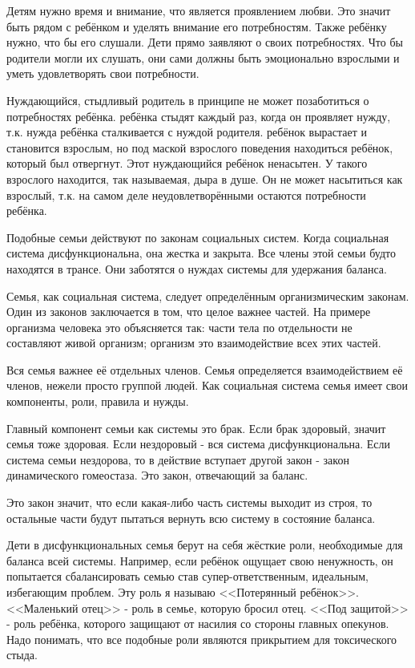 \documentclass[10pt, fleqn]{article}
\begin{document}
Детям нужно время и внимание, что является проявлением любви. Это значит быть рядом с ребёнком и уделять внимание его потребностям. Также ребёнку нужно, что бы его слушали. Дети прямо заявляют о своих потребностях. Что бы родители могли их слушать, они сами должны быть эмоционально взрослыми и уметь удовлетворять свои потребности.

Нуждающийся, стыдливый родитель в принципе не может позаботиться о потребностях ребёнка. ребёнка стыдят каждый раз, когда он проявляет нужду, т.к. нужда ребёнка сталкивается с нуждой родителя. ребёнок вырастает и становится взрослым, но под маской взрослого поведения находиться ребёнок, который был отвергнут. Этот нуждающийся ребёнок ненасытен. У такого взрослого находится, так называемая, дыра в душе. Он не может насытиться как взрослый, т.к. на самом деле неудовлетворёнными остаются потребности ребёнка.

Подобные семьи действуют по законам социальных систем. Когда социальная система дисфункциональна, она жестка и закрыта. Все члены этой семьи будто находятся в трансе. Они заботятся о нуждах системы для удержания баланса.



Семья, как социальная система, следует определённым организмическим законам. Один из законов заключается в том, что целое важнее частей. На примере организма человека это объясняется так: части тела по отдельности не составляют живой организм; организм это взаимодействие всех этих частей.

Вся семья важнее её отдельных членов. Семья определяется взаимодействием её членов, нежели просто группой людей. Как социальная система семья имеет свои компоненты, роли, правила и нужды.

Главный компонент семьи как системы это брак. Если брак здоровый, значит семья тоже здоровая. Если нездоровый - вся система дисфункциональна. Если система семьи нездорова, то в действие вступает другой закон - закон динамического гомеостаза. Это закон, отвечающий за баланс.

Это закон значит, что если какая-либо часть системы выходит из строя, то остальные части будут пытаться вернуть всю систему в состояние баланса.

Дети в дисфункциональных семья берут на себя жёсткие роли, необходимые для баланса всей системы. Например, если ребёнок ощущает свою ненужность, он попытается сбалансировать семью став супер-ответственным, идеальным, избегающим проблем. Эту роль я называю <<Потерянный ребёнок>>.
<<Маленький отец>> - роль в семье, которую бросил отец. <<Под защитой>> - роль ребёнка, которого защищают от насилия со стороны главных опекунов.
Надо понимать, что все подобные роли являются прикрытием для токсического стыда.
\end{document}
